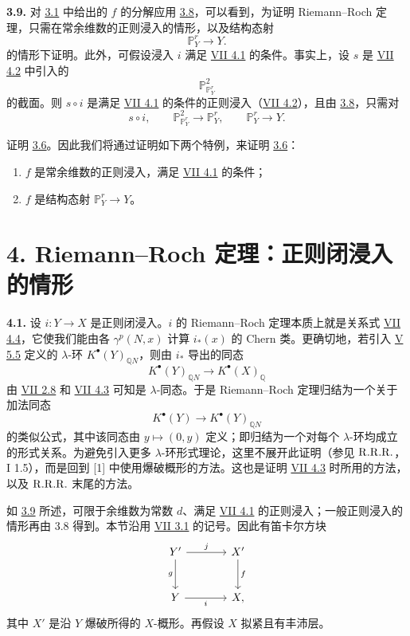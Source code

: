 \textbf{3.9.} 对 \hyperlink{sga6.e08.para.3-1}{3.1} 中给出的 \(f\) 的分解应用 \hyperlink{sga6.e08.lem.3-8}{3.8}，可以看到，为证明 Riemann--Roch 定理，只需在常余维数的正则浸入的情形，以及结构态射
\[
 \mathbb P^r_Y\longrightarrow Y .
\]
的情形下证明。此外，可假设浸入 \(i\) 满足 \hyperlink{sga6.e07.lem.4-1}{VII 4.1} 的条件。事实上，设 \(s\) 是 \hyperlink{sga6.e07.sec.4.2}{VII 4.2} 中引入的
\[
 \mathbb P^2_{\mathbb P^r_Y}
\]
的截面。则 \(s\circ i\) 是满足 \hyperlink{sga6.e07.lem.4-1}{VII 4.1} 的条件的正则浸入（\hyperlink{sga6.e07.sec.4.2}{VII 4.2}），且由 \hyperlink{sga6.e08.lem.3-8}{3.8}，只需对
\[
s\circ i,\qquad
\mathbb P^2_{\mathbb P^r_Y}\longrightarrow\mathbb P^r_Y,\qquad
\mathbb P^r_Y\longrightarrow Y .
\]

证明 \hyperlink{sga6.e08.thm.3-6}{3.6}。因此我们将通过证明如下两个特例，来证明 \hyperlink{sga6.e08.thm.3-6}{3.6}：
\begin{enumerate}[label=\roman*)]
\item \(f\) 是常余维数的正则浸入，满足 \hyperlink{sga6.e07.lem.4-1}{VII 4.1} 的条件；
\item \(f\) 是结构态射 \(\mathbb P^r_Y\to Y\)。
\end{enumerate}

\section*{4. Riemann--Roch 定理：正则闭浸入的情形}

\textbf{4.1.} 设 \(i:Y\to X\) 是正则闭浸入。\(i\) 的 Riemann--Roch 定理本质上就是关系式 \hyperlink{sga6.e07.cor.4-4}{VII 4.4}，它使我们能由各 \(\gamma^p(N,x)\) 计算 \(i_*(x)\) 的 Chern 类。更确切地，若引入 \hyperlink{sga6.e05.para.5-5}{V 5.5} 定义的 \(\lambda\)-环 \(K^{\bullet}(Y)_{\mathbb Q N}\)，则由 \(i_*\) 导出的同态
\[
K^{\bullet}(Y)_{\mathbb Q N}\longrightarrow K^{\bullet}(X)_{\mathbb Q}
\]
由 \hyperlink{sga6.e07.cor.2-8}{VII 2.8} 和 \hyperlink{sga6.e07.thm.4-3}{VII 4.3} 可知是 \(\lambda\)-同态。于是 Riemann--Roch 定理归结为一个关于加法同态
\[
K^{\bullet}(Y)\longrightarrow K^{\bullet}(Y)_{\mathbb Q N}
\]
的类似公式，其中该同态由 \(y\mapsto(0,y)\) 定义；即归结为一个对每个 \(\lambda\)-环均成立的形式关系。为避免引入更多 \(\lambda\)-环形式理论，这里不展开此证明（参见 \(\mathrm{R.R.R.}\)，I 1.5），而是回到 [1] 中使用爆破概形的方法。这也是证明 \hyperlink{sga6.e07.thm.4-3}{VII 4.3} 时所用的方法，以及 \(\mathrm{R.R.R.}\) 末尾的方法。

如 \hyperlink{sga6.e08.para.3-9}{3.9} 所述，可限于余维数为常数 \(d\)、满足 \hyperlink{sga6.e07.lem.4-1}{VII 4.1} 的正则浸入；一般正则浸入的情形再由 3.8 得到。本节沿用 \hyperlink{sga6.e07.para.3-1}{VII 3.1} 的记号。因此有笛卡尔方块
\[
\begin{tikzcd}[column sep=large,row sep=large]
Y' \arrow[r,"j"] \arrow[d,"g"'] & X' \arrow[d,"f"]\\
Y \arrow[r,"i"'] & X ,
\end{tikzcd}
\]
其中 \(X'\) 是沿 \(Y\) 爆破所得的 \(X\)-概形。再假设 \(X\) 拟紧且有丰沛层。

